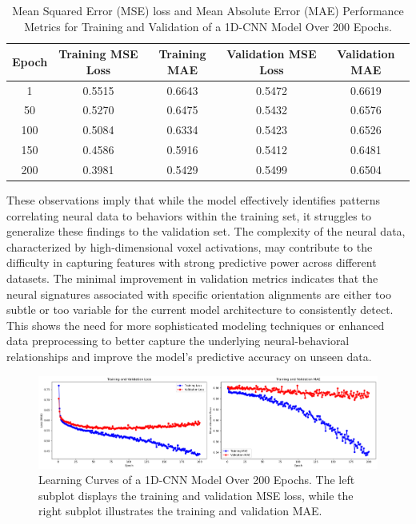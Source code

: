 \documentclass[a4paper]{article}
\begin{document}
\begin{table}[H]
\centering
\begin{tabular}{|c|c|c|c|c|}
\hline
\textbf{Epoch} & \textbf{Training MSE Loss} & \textbf{Training MAE} & \textbf{Validation MSE Loss} & \textbf{Validation MAE} \\ \hline
1              & 0.5515                     & 0.6643                & 0.5472                       & 0.6619                  \\ \hline
50             & 0.5270                     & 0.6475                & 0.5432                       & 0.6576                  \\ \hline
100            & 0.5084                     & 0.6334                & 0.5423                       & 0.6526                  \\ \hline
150            & 0.4586                     & 0.5916                & 0.5412                       & 0.6481                  \\ \hline
200            & 0.3981                     & 0.5429                & 0.5499                       & 0.6504                  \\ \hline
\end{tabular}
\caption{Mean Squared Error (MSE) loss and Mean Absolute Error (MAE) Performance Metrics for Training and Validation of a 1D-CNN Model Over 200 Epochs.}
\label{tab:1dcnnmodel_performance}
\end{table}

\noindent These observations imply that while the model effectively identifies patterns correlating neural data to behaviors within the training set, it struggles to generalize these findings to the validation set. The complexity of the neural data, characterized by high-dimensional voxel activations, may contribute to the difficulty in capturing features with strong predictive power across different datasets. The minimal improvement in validation metrics indicates that the neural signatures associated with specific orientation alignments are either too subtle or too variable for the current model architecture to consistently detect. This shows the need for more sophisticated modeling techniques or enhanced data preprocessing to better capture the underlying neural-behavioral relationships and improve the model's predictive accuracy on unseen data.

\begin{figure}
    \centering
    \includegraphics[width=1\linewidth]{MSE_MAE_1D.png}
    \caption{Learning Curves of a 1D-CNN Model Over 200 Epochs. The left subplot displays the training and validation MSE loss, while the right subplot illustrates the training and validation MAE.}
    \label{fig:updated1Dmse}
\end{figure}
\end{document}
